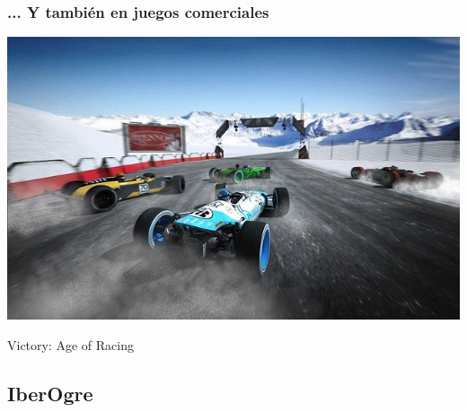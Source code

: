 \documentclass[green]{beamer}
\begin{document}
\begin{frame}
    \frametitle{... Y también en juegos comerciales}
    \begin{center}
	\includegraphics[scale=0.4]{img/victory.jpg}
	    
	\tiny{Victory: Age of Racing}
    \end{center}
\end{frame}

\subsection{IberOgre}
\end{document}
